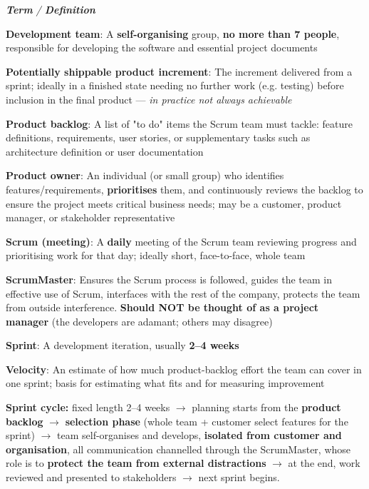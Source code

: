 \begin{studycolumns}
\begin{referenceentries}
\textit{\textbf{Term} / \textbf{Definition}}\par\smallskip
\noindent \textbf{\textbf{Development team}}: A \textbf{self-organising} group, \textbf{no more than 7 people}, responsible for developing the software and essential project documents\par
\noindent \textbf{\textbf{Potentially shippable product increment}}: The increment delivered from a sprint; ideally in a finished state needing no further work (e.g. testing) before inclusion in the final product --- \emph{in practice not always achievable}\par
\noindent \textbf{\textbf{Product backlog}}: A list of "to do" items the Scrum team must tackle: feature definitions, requirements, user stories, or supplementary tasks such as architecture definition or user documentation\par
\noindent \textbf{\textbf{Product owner}}: An individual (or small group) who identifies features/\allowbreak{}requirements, \textbf{prioritises} them, and continuously reviews the backlog to ensure the project meets critical business needs; may be a customer, product manager, or stakeholder representative\par
\noindent \textbf{\textbf{Scrum (meeting)}}: A \textbf{daily} meeting of the Scrum team reviewing progress and prioritising work for that day; ideally short, face-to-face, whole team\par
\noindent \textbf{\textbf{ScrumMaster}}: Ensures the Scrum process is followed, guides the team in effective use of Scrum, interfaces with the rest of the company, protects the team from outside interference. \textbf{Should NOT be thought of as a project manager} (the developers are adamant; others may disagree)\par
\noindent \textbf{\textbf{Sprint}}: A development iteration, usually \textbf{2--4 weeks}\par
\noindent \textbf{\textbf{Velocity}}: An estimate of how much product-backlog effort the team can cover in one sprint; basis for estimating what fits and for measuring improvement\par
\end{referenceentries}
\textbf{Sprint cycle:} fixed length 2--4 weeks \ensuremath{\rightarrow} planning starts from the \textbf{product backlog} \ensuremath{\rightarrow} \textbf{selection phase} (whole team + customer select features for the sprint) \ensuremath{\rightarrow} team self-organises and develops, \textbf{isolated from customer and organisation}, all communication channelled through the ScrumMaster, whose role is to \textbf{protect the team from external distractions} \ensuremath{\rightarrow} at the end, work reviewed and presented to stakeholders \ensuremath{\rightarrow} next sprint begins.


\end{studycolumns}
